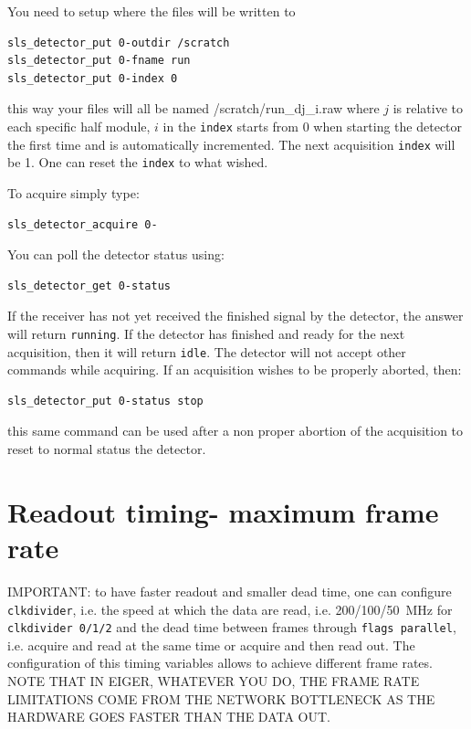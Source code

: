 \documentclass{article}
\begin{document}
You need to setup where the files will be written to
\begin{verbatim}
sls_detector_put 0-outdir /scratch
sls_detector_put 0-fname run
sls_detector_put 0-index 0
\end{verbatim}
this way your files will all be named /scratch/run\_dj\_i.raw where $j$ is relative to each specific half module, $i$ in the {\tt{index}} starts from 0 when starting the detector the first time and is automatically incremented. The next acquisition {\tt{index}} will be 1. One can reset the  {\tt{index}} to what wished.

To acquire simply type:
\begin{verbatim}
sls_detector_acquire 0-
\end{verbatim}

You can poll the detector status using:
\begin{verbatim}
sls_detector_get 0-status 
\end{verbatim}
If the receiver has not yet received the finished signal by the detector, the answer will return {\tt{running}}. If the detector has finished and ready for the next acquisition, then it will return {\tt{idle}}.
The detector will not accept other commands while acquiring. If an acquisition wishes to be properly aborted, then:
\begin{verbatim}
sls_detector_put 0-status stop 
\end{verbatim}
this same command can be used after a non proper abortion of the acquisition to reset to normal status the detector.

\section{Readout timing- maximum frame rate}\label{timing}
IMPORTANT: to have faster readout and smaller dead time, one can configure {\tt{clkdivider}}, i.e. the speed at which the data are read, i.e. 200/100/50~MHz for {\tt{clkdivider 0/1/2}} and the dead time between frames through {\tt{flags parallel}}, i.e. acquire and read at the same time or acquire and then read out.
The configuration of this timing variables allows to achieve different frame rates. NOTE THAT IN EIGER, WHATEVER YOU DO, THE FRAME RATE LIMITATIONS COME FROM THE NETWORK BOTTLENECK AS THE HARDWARE GOES FASTER THAN THE DATA OUT.
\end{document}
